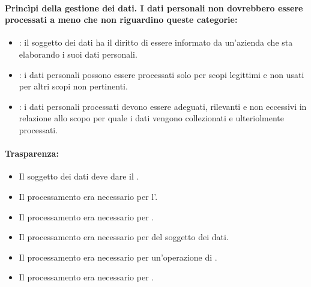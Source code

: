
\paragraph{Princìpi della gestione dei dati. I dati personali non dovrebbero essere processati a meno che non riguardino queste categorie:}

\begin{itemize}
  \item {}: il soggetto dei dati ha il diritto di essere informato da un'azienda che sta elaborando i suoi dati personali.
  \item {}: i dati personali possono essere processati solo per scopi legittimi e non usati per altri scopi non pertinenti.
  \item {}: i dati personali processati devono essere adeguati, rilevanti e non eccessivi in relazione allo scopo per quale i dati vengono collezionati e ulteriolmente processati.
\end{itemize}

\paragraph{Trasparenza:}

\begin{itemize}
  \item Il soggetto dei dati deve dare il . 
  \item Il processamento era necessario per l'. 
  \item Il processamento era necessario per . 
  \item Il processamento era necessario per  del soggetto dei dati.
  \item Il processamento era necessario per un'operazione di . 
  \item Il processamento era necessario per .
\end{itemize}


